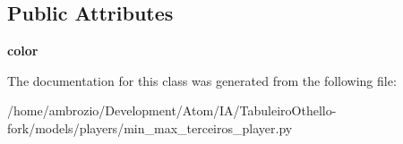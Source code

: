 \subsection*{Public Attributes}
\begin{DoxyCompactItemize}
\item 
\hypertarget{class_tabuleiro_othello-fork_1_1models_1_1players_1_1min__max__terceiros__player_1_1_min_max_player_af0d12d0d792f598aacbca8013517ed09}{}{\bfseries color}\label{class_tabuleiro_othello-fork_1_1models_1_1players_1_1min__max__terceiros__player_1_1_min_max_player_af0d12d0d792f598aacbca8013517ed09}

\end{DoxyCompactItemize}


The documentation for this class was generated from the following file\+:\begin{DoxyCompactItemize}
\item 
/home/ambrozio/\+Development/\+Atom/\+I\+A/\+Tabuleiro\+Othello-\/fork/models/players/min\+\_\+max\+\_\+terceiros\+\_\+player.\+py\end{DoxyCompactItemize}
